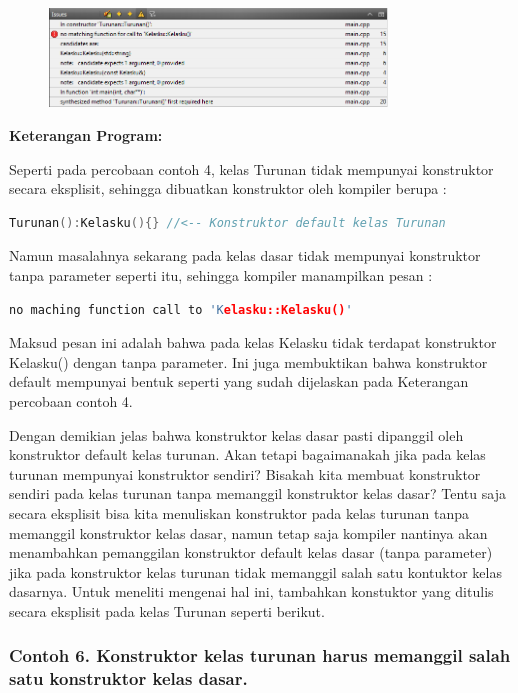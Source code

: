 \begin{figure}[htbp]
\centering
\includegraphics[width=0.8\textwidth]{images/capture7-2.png}

\end{figure}

\textbf{Keterangan Program:}

Seperti pada percobaan contoh 4, kelas Turunan tidak mempunyai
konstruktor secara eksplisit, sehingga dibuatkan konstruktor oleh
kompiler berupa :

\begin{lstlisting}[language=c++]
Turunan():Kelasku(){} //<-- Konstruktor default kelas Turunan
\end{lstlisting}

Namun masalahnya sekarang pada kelas dasar tidak mempunyai konstruktor
tanpa parameter seperti itu, sehingga kompiler manampilkan pesan :

\begin{lstlisting}[language=c++]
no maching function call to 'Kelasku::Kelasku()'
\end{lstlisting}

Maksud pesan ini adalah bahwa pada kelas Kelasku tidak terdapat
konstruktor Kelasku() dengan tanpa parameter. Ini juga membuktikan bahwa
konstruktor default mempunyai bentuk seperti yang sudah dijelaskan pada
Keterangan percobaan contoh 4.

Dengan demikian jelas bahwa konstruktor kelas dasar pasti dipanggil oleh
konstruktor default kelas turunan. Akan tetapi bagaimanakah jika pada
kelas turunan mempunyai konstruktor sendiri? Bisakah kita membuat
konstruktor sendiri pada kelas turunan tanpa memanggil konstruktor kelas
dasar? Tentu saja secara eksplisit bisa kita menuliskan konstruktor pada
kelas turunan tanpa memanggil konstruktor kelas dasar, namun tetap saja
kompiler nantinya akan menambahkan pemanggilan konstruktor default kelas
dasar (tanpa parameter) jika pada konstruktor kelas turunan tidak
memanggil salah satu kontuktor kelas dasarnya. Untuk meneliti mengenai
hal ini, tambahkan konstuktor yang ditulis secara eksplisit pada kelas
Turunan seperti berikut.

\subsubsection*{Contoh 6. Konstruktor kelas turunan harus memanggil salah satu
konstruktor kelas dasar.}


